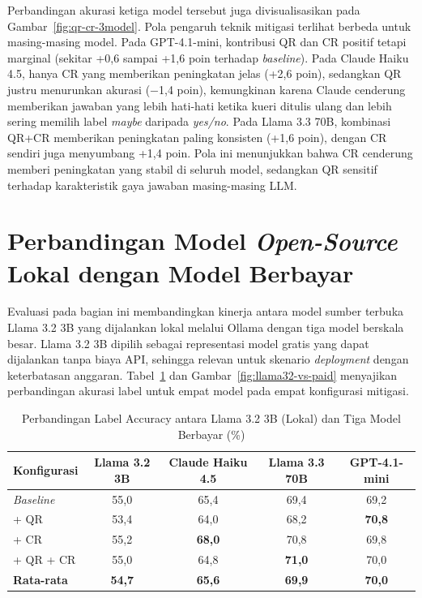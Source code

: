 Perbandingan akurasi ketiga model tersebut juga divisualisasikan pada Gambar~\ref{fig:qr-cr-3model}. Pola pengaruh teknik mitigasi terlihat berbeda untuk masing-masing model. Pada GPT-4.1-mini, kontribusi QR dan CR positif tetapi marginal (sekitar +0{,}6 sampai +1{,}6 poin terhadap \textit{baseline}). Pada Claude Haiku 4.5, hanya CR yang memberikan peningkatan jelas (+2{,}6 poin), sedangkan QR justru menurunkan akurasi ($-$1{,}4 poin), kemungkinan karena Claude cenderung memberikan jawaban yang lebih hati-hati ketika kueri ditulis ulang dan lebih sering memilih label \textit{maybe} daripada \textit{yes/no}. Pada Llama 3.3 70B, kombinasi QR+CR memberikan peningkatan paling konsisten (+1{,}6 poin), dengan CR sendiri juga menyumbang +1{,}4 poin. Pola ini menunjukkan bahwa CR cenderung memberi peningkatan yang stabil di seluruh model, sedangkan QR sensitif terhadap karakteristik gaya jawaban masing-masing LLM.

\section{Perbandingan Model \textit{Open-Source} Lokal dengan Model Berbayar}
\label{lamp:llama32-vs-paid}

Evaluasi pada bagian ini membandingkan kinerja antara model sumber terbuka Llama 3.2 3B yang dijalankan lokal melalui Ollama dengan tiga model berskala besar. Llama 3.2 3B dipilih sebagai representasi model gratis yang dapat dijalankan tanpa biaya API, sehingga relevan untuk skenario \textit{deployment} dengan keterbatasan anggaran. Tabel~\ref{tbl:llama32-vs-paid} dan Gambar~\ref{fig:llama32-vs-paid} menyajikan perbandingan akurasi label untuk empat model pada empat konfigurasi mitigasi.

\begin{table}[H]
\centering
\small
\setlength{\tabcolsep}{5pt}
\caption{Perbandingan Label Accuracy antara Llama 3.2 3B (Lokal) dan Tiga Model Berbayar (\%)}
\label{tbl:llama32-vs-paid}
\begin{tabular}{lcccc}
\toprule
\textbf{Konfigurasi} & \textbf{Llama 3.2 3B} & \textbf{Claude Haiku 4.5} & \textbf{Llama 3.3 70B} & \textbf{GPT-4.1-mini} \\
\midrule
\textit{Baseline} & 55{,}0 & 65{,}4 & 69{,}4 & 69{,}2 \\
+ QR              & 53{,}4 & 64{,}0 & 68{,}2 & \textbf{70{,}8} \\
+ CR              & 55{,}2 & \textbf{68{,}0} & 70{,}8 & 69{,}8 \\
+ QR + CR         & 55{,}0 & 64{,}8 & \textbf{71{,}0} & 70{,}0 \\
\midrule
\textbf{Rata-rata} & \textbf{54{,}7} & \textbf{65{,}6} & \textbf{69{,}9} & \textbf{70{,}0} \\
\bottomrule
\end{tabular}
\end{table}

